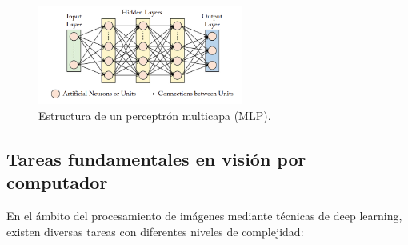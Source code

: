 \documentclass[11pt,spanish,listoffigures,listoftables]{tfgetsinf}
\begin{document}
\begin{figure}[H]
   \centering
   \includegraphics[width=0.6\textwidth]{images/estado_del_arte/multilayer_perceptron.png}
   \caption{Estructura de un perceptrón multicapa (MLP).}
   \label{fig:multilayer_perceptron}
\end{figure}

\subsection{Tareas fundamentales en visión por computador}
En el ámbito del procesamiento de imágenes mediante técnicas de deep learning, existen diversas tareas con diferentes niveles de complejidad:
\end{document}
